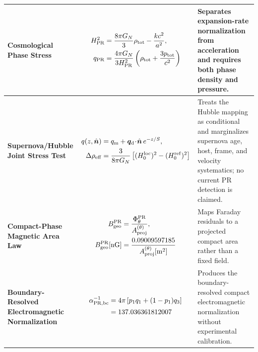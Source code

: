 \documentclass[11pt]{article}
\begin{document}
\begin{table}[H]
\begin{tabular}{p{5.0cm} p{6.2cm} p{5.5cm}}
\raggedright \textbf{Cosmological\\Phase Stress} &
\vspace{-1.2em}
\begin{equation*}
\begin{aligned}
H_{\rm PR}^2
&=
\frac{8\pi G_N}{3}\rho_{\rm tot}-\frac{kc^2}{a^2},\\
q_{\rm PR}
&=
\frac{4\pi G_N}{3H_{\rm PR}^2}
\left(\rho_{\rm tot}+\frac{3p_{\rm tot}}{c^2}\right)
\end{aligned}
\end{equation*}
& Separates expansion-rate normalization from acceleration and requires both phase density and pressure. \\
\hline

\raggedright \textbf{Supernova/Hubble\\Joint Stress Test} &
\vspace{-1.2em}
\begin{equation*}
\begin{aligned}
q(z,\hat{\bm n})
&=q_{\rm m}+\bm q_{\rm d}\!\cdot\!\hat{\bm n}\,e^{-z/S},\\
\Delta\rho_{\rm eff}
&=\frac{3}{8\pi G_N}
\left[(H_0^{\rm loc})^2-(H_0^{\rm ref})^2\right]
\end{aligned}
\end{equation*}
& Treats the Hubble mapping as conditional and marginalizes supernova age, host, frame, and velocity systematics; no current PR detection is claimed. \\
\hline

\raggedright \textbf{Compact-Phase\\Magnetic Area Law} &
\vspace{-1.2em}
\begin{equation*}
\begin{aligned}
B_{\rm geo}^{\rm PR}
&=\frac{\Phi_{\theta}^{\rm PR}}{A_{\rm proj}^{(\theta)}},\\
B_{\rm geo}^{\rm PR}[{\rm nG}]
&=\frac{0.09009597185}{A_{\rm proj}^{(\theta)}[{\rm m}^2]}
\end{aligned}
\end{equation*}
& Maps Faraday residuals to a projected compact area rather than a fixed field. \\ \hline

\raggedright \textbf{Boundary-Resolved\\Electromagnetic Normalization} & 
\vspace{-1.2em} \begin{equation*} 
\begin{aligned}
\alpha_{\rm PR,bc}^{-1} &= 4\pi \left[ p_1 q_1 + (1-p_1)q_3 \right] \\
&= 137.036361812007
\end{aligned}
\end{equation*} & 
Produces the boundary-resolved compact electromagnetic normalization without experimental calibration. \\ \hline
\hline
\end{tabular}
\end{table}
\end{document}
